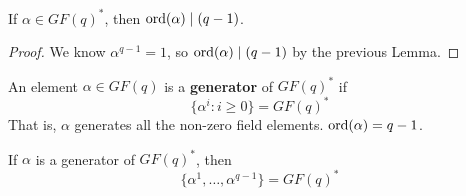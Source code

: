 \begin{thmbox}
    \begin{corollary}
        If $ \alpha\in GF(q)^* $, then $ \operatorname{ord}(\alpha)\mid (q-1) $.
    \end{corollary}
\end{thmbox}

\begin{proof}
    We know $ \alpha^{q-1}=1 $, so $ \operatorname{ord}(\alpha)\mid (q-1) $ by
    the previous Lemma.
\end{proof}

\begin{defbox}
    \begin{definition}
        An element $ \alpha\in GF(q) $ is a \textbf{generator} of
        $ GF(q)^* $ if 
        \[ \{\alpha^i:i\geqslant 0\}=GF(q)^* \]
        That is, $ \alpha $ generates all the non-zero field elements.
        $ \operatorname{ord}(\alpha)=q-1 $.
    \end{definition}
\end{defbox}

\begin{thmbox}
    \begin{theorem}
        If $ \alpha $ is a generator of $ GF(q)^* $, then
        \[ \{\alpha^1,\ldots ,\alpha^{q-1}\}=GF(q)^* \]
    \end{theorem}
\end{thmbox}
